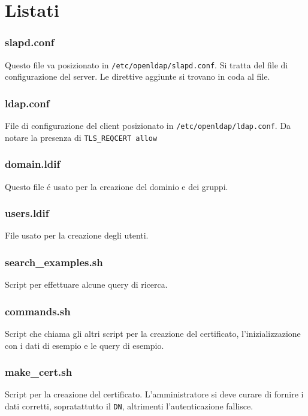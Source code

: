 \documentclass[11pt, a4paper, oneside]{article}
\begin{document}
	\part{Listati}
		\section{slapd.conf}
			\par
				Questo file va posizionato in 
				\texttt{/etc/openldap/slapd.conf}. Si tratta 
				del file di configurazione del server. Le 
				direttive aggiunte si trovano in coda al file.
			
			\newpage
		\section{ldap.conf}
			\par
				File di configurazione del client posizionato 
				in \texttt{/etc/openldap/ldap.conf}. Da notare 
				la presenza di \texttt{TLS\_REQCERT     allow}
			
			\newpage
		\section{domain.ldif}
			\par
				Questo file \'e usato per la creazione del
				dominio e dei gruppi.
			
			\newpage
		\section{users.ldif}
			\par
				File usato per la creazione degli utenti.
			
			\newpage
		\section{search\_examples.sh}
			\par
				Script per effettuare alcune query di ricerca.
			
			\newpage
		\section{commands.sh}
			\par
				Script che chiama gli altri script per la 
				creazione del certificato, l'inizializzazione 
				con i dati di esempio e le query di esempio.
			
			\newpage
		\section{make\_cert.sh}
			\par
				Script per la creazione  del certificato.
				L'amministratore si deve curare di fornire i
				dati corretti, sopratattutto il \texttt{DN},
				altrimenti l'autenticazione fallisce.
			
			\newpage
\end{document}
